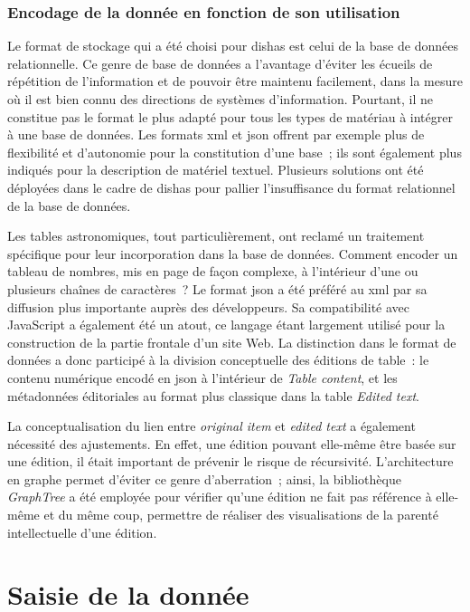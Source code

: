 \documentclass[a4paper,12pt,twoside]{book}
\newcommand{\eng}{\emph}
\newcommand{\oi}{\eng{original item}\xspace}
\newcommand{\bdd}{base de données\xspace}
\newcommand{\dishas}{\gls{dishas}\xspace}
\newcommand{\xml}{\gls{xml}\xspace}
\newcommand{\json}{\gls{json}\xspace}
\begin{document}
			\subsubsection{Encodage de la donnée en fonction de son utilisation}
Le format de stockage qui a été choisi pour \dishas est celui de la \bdd relationnelle. Ce genre de \bdd a l'avantage d'éviter les écueils de répétition de l'information et de pouvoir être maintenu facilement, dans la mesure où il est bien connu des directions de systèmes d'information. Pourtant, il ne constitue pas le format le plus adapté pour tous les types de matériau à intégrer à une base de données. Les formats \xml et \json offrent par exemple plus de flexibilité et d'autonomie pour la constitution d'une base~; ils sont également plus indiqués pour la description de matériel textuel. Plusieurs solutions ont été déployées dans le cadre de \dishas pour pallier l'insuffisance du format relationnel de la base de données.

Les tables astronomiques, tout particulièrement, ont reclamé un traitement spécifique pour leur incorporation dans la \bdd. Comment encoder un tableau de nombres, mis en page de façon complexe, à l'intérieur d'une ou plusieurs chaînes de caractères~? Le format \json a été préféré au \xml par sa diffusion plus importante auprès des développeurs. Sa compatibilité avec JavaScript a également été un atout, ce langage étant largement utilisé pour la construction de la partie frontale d'un site Web. La distinction dans le format de données a donc participé à la division conceptuelle des éditions de table~: le contenu numérique encodé en \json à l'intérieur de \eng{Table content}, et les métadonnées éditoriales au format plus classique dans la table \eng{Edited text}.

La conceptualisation du lien entre \oi et \eng{edited text} a également nécessité des ajustements. En effet, une édition pouvant elle-même être basée sur une édition, il était important de prévenir le risque de récursivité. L'architecture en graphe permet d'éviter ce genre d'aberration~; ainsi, la bibliothèque \eng{GraphTree} a été employée pour vérifier qu'une édition ne fait pas référence à elle-même et du même coup, permettre de réaliser des visualisations de la parenté intellectuelle d'une édition.

	\section{Saisie de la donnée}
\end{document}
